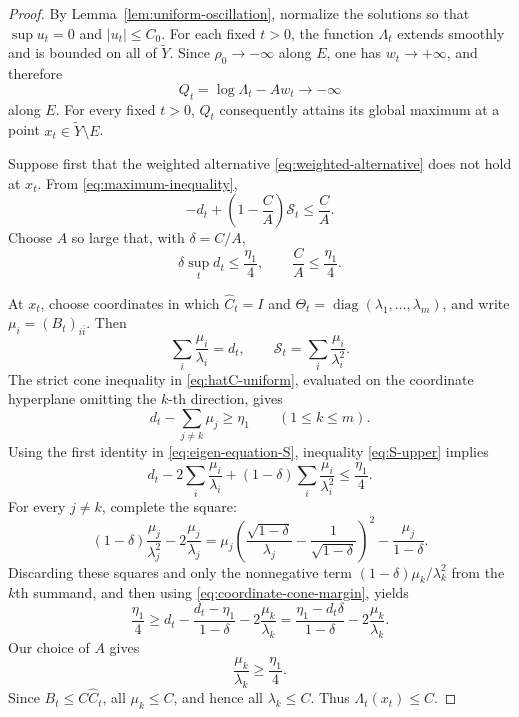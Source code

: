 \documentclass[reqno]{amsart}
\theoremstyle{plain}
\theoremstyle{remark}
\begin{document}
\begin{proof}
By Lemma~\ref{lem:uniform-oscillation}, normalize the solutions so that
$\sup u_t=0$ and $|u_t|\leq C_0$. For each fixed $t>0$, the function
$\Lambda_t$ extends smoothly and is bounded on all of $\widetilde Y$.
Since $\rho_0\to-\infty$ along $E$, one has
$w_t\to+\infty$, and therefore
\[
 Q_t=\log\Lambda_t-Aw_t\longrightarrow-\infty
\]
along $E$. For every fixed $t>0$, $Q_t$ consequently
attains its global maximum at a point $x_t\in\widetilde Y\setminus E$.

Suppose first that the weighted alternative
\eqref{eq:weighted-alternative} does not hold at $x_t$.  From
\eqref{eq:maximum-inequality},
\begin{equation}\label{eq:S-upper}
 -d_t+\left(1-\frac CA\right)\mathcal S_t
 \leq\frac CA.
\end{equation}
Choose $A$ so large that, with $\delta=C/A$,
\[
 \delta\sup_t d_t\leq\frac{\eta_1}{4},
 \qquad
 \frac CA\leq\frac{\eta_1}{4}.
\]

At $x_t$, choose coordinates in which
$\widehat C_t=I$ and
$\Theta_t=\operatorname{diag}(\lambda_1,\ldots,\lambda_m)$, and
write $\mu_i=(B_t)_{i\bar i}$.  Then
\begin{equation}\label{eq:eigen-equation-S}
 \sum_i\frac{\mu_i}{\lambda_i}=d_t,
 \qquad
 \mathcal S_t=\sum_i\frac{\mu_i}{\lambda_i^2}.
\end{equation}
The strict cone inequality in \eqref{eq:hatC-uniform}, evaluated on the
coordinate hyperplane omitting the $k$-th direction, gives
\begin{equation}\label{eq:coordinate-cone-margin}
 d_t-\sum_{j\ne k}\mu_j\geq\eta_1
 \qquad(1\leq k\leq m).
\end{equation}
Using the first identity in \eqref{eq:eigen-equation-S}, inequality
\eqref{eq:S-upper} implies
\[
 d_t-2\sum_i\frac{\mu_i}{\lambda_i}
 +(1-\delta)\sum_i\frac{\mu_i}{\lambda_i^2}
 \leq\frac{\eta_1}{4}.
\]
For every $j\ne k$, complete the square:
\[
 (1-\delta)\frac{\mu_j}{\lambda_j^2}
 -2\frac{\mu_j}{\lambda_j}
 =\mu_j\left(
   \frac{\sqrt{1-\delta}}{\lambda_j}
   -\frac1{\sqrt{1-\delta}}
  \right)^2-\frac{\mu_j}{1-\delta}.
\]
Discarding these squares and only the nonnegative term
$(1-\delta)\mu_k/\lambda_k^2$ from the $k$th summand, and then using
\eqref{eq:coordinate-cone-margin}, yields
\[
 \frac{\eta_1}{4}
 \geq d_t-\frac{d_t-\eta_1}{1-\delta}
       -2\frac{\mu_k}{\lambda_k}
 =\frac{\eta_1-d_t\delta}{1-\delta}
       -2\frac{\mu_k}{\lambda_k}.
\]
Our choice of $A$ gives
\[
 \frac{\mu_k}{\lambda_k}\geq\frac{\eta_1}{4}.
\]
Since $B_t\leq C\widehat C_t$, all $\mu_k\leq C$, and hence
all $\lambda_k\leq C$.  Thus $\Lambda_t(x_t)\leq C$.


\end{proof}
\end{document}
